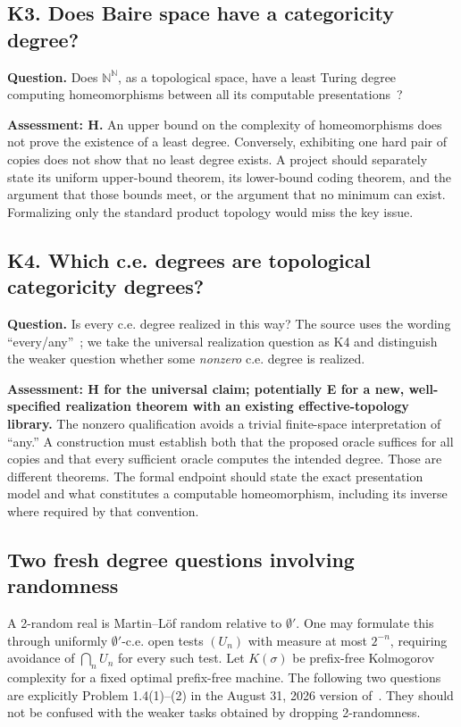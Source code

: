 \documentclass[11pt,a4paper]{article}
\newcommand{\N}{\mathbb N}
\newcommand{\problem}[2]{\subsection{#1. #2}\label{entry:#1}}
\theoremstyle{definition}\newtheorem{definition}[theorem]{Definition}
\theoremstyle{remark}\newtheorem{remark}[theorem]{Remark}
\begin{document}
\problem{K3}{Does Baire space have a categoricity degree?}
\textbf{Question.} Does $\N^{\N}$, as a topological space, have a least Turing
degree computing homeomorphisms between all its computable
presentations~\cite{Workshop25}?

\textbf{Assessment: H.} An upper bound on the complexity of homeomorphisms
does not prove the existence of a least degree. Conversely, exhibiting one
hard pair of copies does not show that no least degree exists. A project
should separately state its uniform upper-bound theorem, its lower-bound
coding theorem, and the argument that those bounds meet, or the argument that
no minimum can exist. Formalizing only the standard product topology would
miss the key issue.

\problem{K4}{Which c.e. degrees are topological categoricity degrees?}
\textbf{Question.} Is every c.e. degree realized in this way? The source uses
the wording ``every/any''~\cite{Workshop25}; we take the universal realization
question as K4 and distinguish the weaker question whether some
\emph{nonzero} c.e. degree is realized.

\textbf{Assessment: H for the universal claim; potentially E for a new,
well-specified realization theorem with an existing effective-topology library.}
The nonzero qualification avoids a trivial finite-space interpretation of
``any.'' A construction must establish both that the proposed oracle suffices
for all copies and that every sufficient oracle computes the intended degree.
Those are different theorems. The formal endpoint should state the exact
presentation model and what constitutes a computable homeomorphism, including
its inverse where required by that convention.

\subsection{Two fresh degree questions involving randomness}
A 2-random real is Martin--L\"of random relative to $\emptyset'$. One may
formulate this through uniformly $\emptyset'$-c.e. open tests $(U_n)$ with
measure at most $2^{-n}$, requiring avoidance of $\bigcap_nU_n$ for every
such test. Let $K(\sigma)$ be prefix-free Kolmogorov complexity for a fixed
optimal prefix-free machine. The following two questions are explicitly
Problem 1.4(1)--(2) in the August 31, 2026 version of~\cite{Workshop26}.
They should not be confused with the weaker tasks obtained by dropping
2-randomness.
\end{document}
